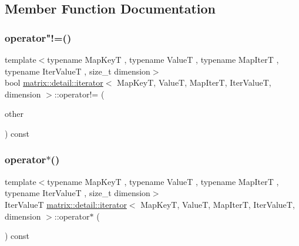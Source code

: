\subsection{Member Function Documentation}
\mbox{\label{structmatrix_1_1detail_1_1iterator_a8ffc746738d7fdd662502bbff86f5fa7}} 
\subsubsection{\texorpdfstring{operator"!=()}{operator!=()}}
{\footnotesize\ttfamily template$<$typename Map\+KeyT , typename ValueT , typename Map\+IterT , typename Iter\+ValueT , size\+\_\+t dimension$>$ \\
bool \hyperlink{structmatrix_1_1detail_1_1iterator}{matrix\+::detail\+::iterator}$<$ Map\+KeyT, ValueT, Map\+IterT, Iter\+ValueT, dimension $>$\+::operator!= (\begin{DoxyParamCaption}\item[{const \hyperlink{structmatrix_1_1detail_1_1iterator}{iterator}$<$ Map\+KeyT, ValueT, Map\+IterT, Iter\+ValueT, dimension $>$ \&}]{other }\end{DoxyParamCaption}) const\hspace{0.3cm}{\ttfamily [inline]}}

\mbox{\label{structmatrix_1_1detail_1_1iterator_a4e622d5c9eb47ee88a955f1ff618e025}} 
\subsubsection{\texorpdfstring{operator$\ast$()}{operator*()}}
{\footnotesize\ttfamily template$<$typename Map\+KeyT , typename ValueT , typename Map\+IterT , typename Iter\+ValueT , size\+\_\+t dimension$>$ \\
Iter\+ValueT \hyperlink{structmatrix_1_1detail_1_1iterator}{matrix\+::detail\+::iterator}$<$ Map\+KeyT, ValueT, Map\+IterT, Iter\+ValueT, dimension $>$\+::operator$\ast$ (\begin{DoxyParamCaption}{ }\end{DoxyParamCaption}) const\hspace{0.3cm}{\ttfamily [inline]}}

